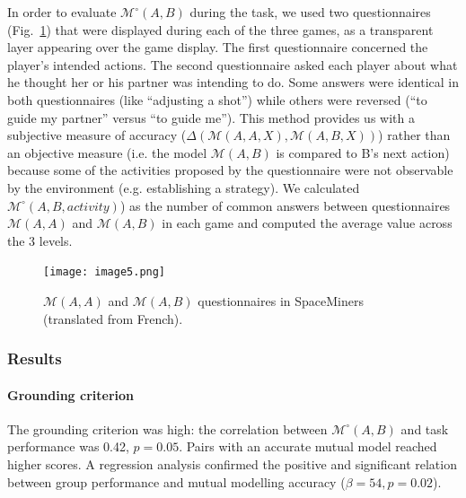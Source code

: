 \documentclass[natbib]{svjour3}
\newcommand{\ie}{i.e.\xspace}
\newcommand{\eg}{e.g.\xspace}
\newcommand{\B}{B\xspace}
\newcommand{\M}[3]{{\mathcal{M}(#1, #2, #3)}}
\newcommand{\gmodel}[2]{{$\mathcal{M}(#1, #2)$}}
\newcommand{\Model}[3]{{$\mathcal{M}^{\circ}(#1, #2, #3)$}}
\newcommand{\gModel}[2]{{$\mathcal{M}^{\circ}(#1, #2)$}}
\begin{document}
In order to evaluate \gModel{A}{B} during the task, we used two questionnaires
(Fig.~\ref{study1:questionnaires}) that were displayed during each of the three
games, as a transparent layer appearing over the game display. The first
questionnaire concerned the player's intended actions. The second questionnaire
asked each player about what he thought her or his partner was intending to do.
Some answers were identical in both questionnaires (like ``adjusting a shot'')
while others were reversed (``to guide my partner'' versus ``to guide me'').
This method provides us with a subjective measure of accuracy
($\Delta(\M{A}{A}{X}, \M{A}{B}{X})$) rather than an objective measure (\ie the
model \gmodel{A}{B} is compared to \B's next action) because some of the
activities proposed by the questionnaire were not observable by the environment
(\eg establishing a strategy). We calculated \Model{A}{B}{activity})
as the number of common answers between questionnaires \gmodel{A}{A} and
\gmodel{A}{B} in each game and computed the average value across the 3 levels.

\begin{figure}[ht!]
        \centering
        \texttt{[image: image5.png]}
        \caption{\gmodel{A}{A} and \gmodel{A}{B} questionnaires in SpaceMiners
        (translated from French).}

        \label{study1:questionnaires}
\end{figure}

\subsubsection*{Results}

\paragraph{Grounding criterion} The grounding criterion was high: the
correlation between \gModel{A}{B} and task performance was 0.42, $p = 0.05$.
Pairs with an accurate mutual model reached higher scores. A regression analysis
confirmed the positive and significant relation between group performance and
mutual modelling accuracy ($\beta=54, p = 0.02$).
\end{document}
